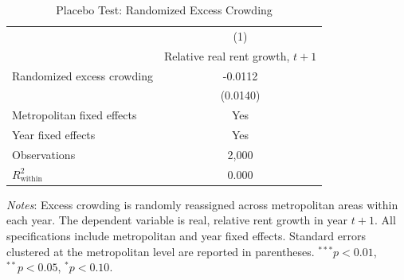 \begin{table}[htbp]
\centering
\caption{Placebo Test: Randomized Excess Crowding}
\label{tab:placebo_random_summary}
\begin{tabular}{lc}
\toprule
 & (1) \\
 & Relative real rent growth, $t{+}1$ \\
\midrule
Randomized excess crowding & -0.0112 \\
                           & (0.0140) \\
\midrule
Metropolitan fixed effects & Yes \\
Year fixed effects        & Yes \\
Observations              & 2,000 \\
$R^2_{\text{within}}$     & 0.000 \\
\bottomrule
\end{tabular}
\begin{flushleft}
\footnotesize
\textit{Notes}: Excess crowding is randomly reassigned across metropolitan areas
within each year. The dependent variable is real, relative rent growth in year $t{+}1$.
All specifications include metropolitan and year fixed effects.
Standard errors clustered at the metropolitan level are reported in parentheses.
$^{***}p<0.01$, $^{**}p<0.05$, $^{*}p<0.10$.
\end{flushleft}
\end{table}
